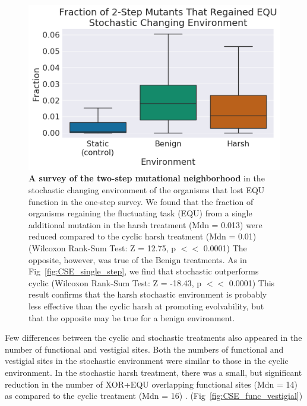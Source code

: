 \documentclass[PhD]{msu-thesis}
\begin{document}
	\begin{figure}[!h] %
	\includegraphics[width=0.75\columnwidth]{figures/CE/CSE_frac_2step__box.png}
	\caption{\textbf{A survey of the two-step mutational neighborhood} in the stochastic changing environment of the organisms that lost EQU function in the one-step survey. We found that the fraction of organisms regaining the fluctuating task (EQU) from a single additional mutation in the harsh treatment (Mdn = 0.013) were reduced compared to the cyclic harsh treatment (Mdn = 0.01) (Wilcoxon Rank-Sum Test: Z = 12.75, p $<<$ 0.0001) The opposite, however, was true of the Benign treatments. As in Fig~\ref{fig:CSE_single_step}, we find that stochastic outperforms cyclic (Wilcoxon Rank-Sum Test: Z = -18.43, p $<<$ 0.0001) This result confirms that the harsh stochastic environment is probably less effective than the cyclic harsh at promoting evolvability, but that the opposite may be true for a benign environment.
	}\label{fig:CSE_two_step}
	\end{figure}

Few differences between the cyclic and stochastic treatments also appeared in the number of functional and vestigial sites. Both the numbers of functional and vestigial sites in the stochastic environment were similar to those in the cyclic environment. In the stochastic harsh treatment, there was a small, but significant reduction in the number of XOR+EQU overlapping functional sites (Mdn = 14) as compared to the cyclic treatment (Mdn = 16) . (Fig~\ref{fig:CSE_func_vestigial}) 
\end{document}
